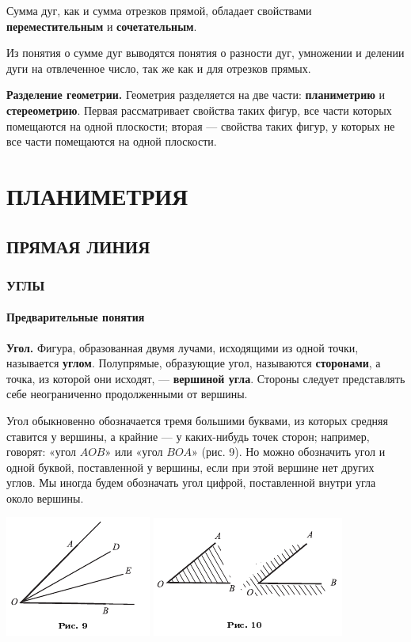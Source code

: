 \documentclass[oneside]{book}
\begin{document}
Сумма дуг, как и сумма отрезков прямой, обладает свойствами \textbf{переместительным} и \textbf{сочетательным}.

Из понятия о сумме дуг выводятся понятия о разности дуг, умножении и делении дуги на отвлеченное число, так же как и для отрезков прямых.


\textbf{Разделение геометрии.}
Геометрия разделяется на две части:
\textbf{планиметрию} и \textbf{стереометрию}.
Первая рассматривает свойства таких фигур, все части которых помещаются на одной плоскости;
вторая — свойства таких фигур, у которых не все части помещаются на одной плоскости.



\part{ПЛАНИМЕТРИЯ}

\chapter{ПРЯМАЯ ЛИНИЯ}


\section{УГЛЫ} 

\subsection*{Предварительные понятия}

\textbf{Угол.}
Фигура, образованная двумя лучами, исходящими из одной точки, называется \textbf{углом}.
Полупрямые, образующие угол, называются \textbf{сторонами}, а точка, из которой они исходят, — \textbf{вершиной угла}.
Стороны следует представлять себе неограниченно продолженными от вершины.

Угол обыкновенно обозначается тремя большими буквами, из которых средняя ставится у вершины, а крайние — у каких-нибудь точек сторон;
например, говорят:
«угол $AOB$» или «угол $BOA$» (рис. 9).
Но можно обозначить угол и одной буквой, поставленной у вершины, если при этой вершине нет других углов.
Мы иногда будем обозначать угол цифрой, поставленной внутри угла около вершины.

\includegraphics{pics/ris-9}
\includegraphics{pics/ris-10}
\end{document}
